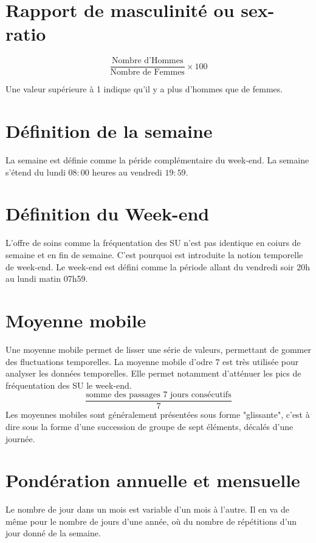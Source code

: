 \documentclass[12pt,english,french,twoside]{report}\usepackage[]{graphicx}\usepackage[]{color}
\begin{document}
\section*{Rapport de masculinité ou sex-ratio}
\begin{displaymath}
    \frac{\text{Nombre d'Hommes}}{\text{Nombre de Femmes}} \times 100
\end{displaymath}

Une valeur supérieure à 1 indique qu'il y a plus d'hommes que de femmes.

\section*{Définition de la semaine}
La semaine est définie comme la péride complémentaire du week-end. La semaine s'étend du lundi $08:00$ heures au vendredi $19:59$.

\section*{Définition du Week-end}
L'offre de soins comme la fréquentation des SU n'est pas identique en coiurs de semaine et en fin de semaine. C'est pourquoi est introduite la notion temporelle de week-end.
Le week-end est défini comme la période allant du vendredi soir 20h au lundi matin 07h59.

\section*{Moyenne mobile}
Une moyenne mobile permet de lisser une série de valeurs, permettant de gommer des fluctuations temporelles. La moyenne mobile d'odre $7$ est très utilisée pour analyser les données temporelles. Elle permet notamment d'atténuer les pics de fréquentation des SU le week-end.
\begin{displaymath}
    \frac{\text{somme des passages 7 jours consécutifs}}{7}
\end{displaymath}
Les moyennes mobiles sont généralement présentées sous forme "glissante", c'est à dire sous la forme d'une succession de groupe de sept éléments, décalés d'une journée.

\section*{Pondération annuelle et mensuelle}
Le nombre de jour dans un mois est variable d'un mois à l'autre. Il en va de même pour le nombre de jours d'une année, où du nombre de répétitions d'un jour donné de la semaine.
\end{document}
